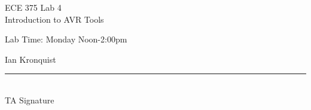 \documentclass[12pt,letterpaper]{article}
\begin{document}
\begin{titlepage}
    \vspace*{4cm}
    \begin{flushright}
    {\huge
        ECE 375 Lab 4\\[1cm]
    }
    {\large
        Introduction to AVR Tools
    }
    \end{flushright}
    \begin{flushleft}
    Lab Time: Monday Noon-2:00pm
    \end{flushleft}
    \begin{flushright}
    Ian Kronquist
    \vfill
    \rule{5in}{.5mm}\\
    TA Signature
    \end{flushright}

\end{titlepage}
\end{document}

